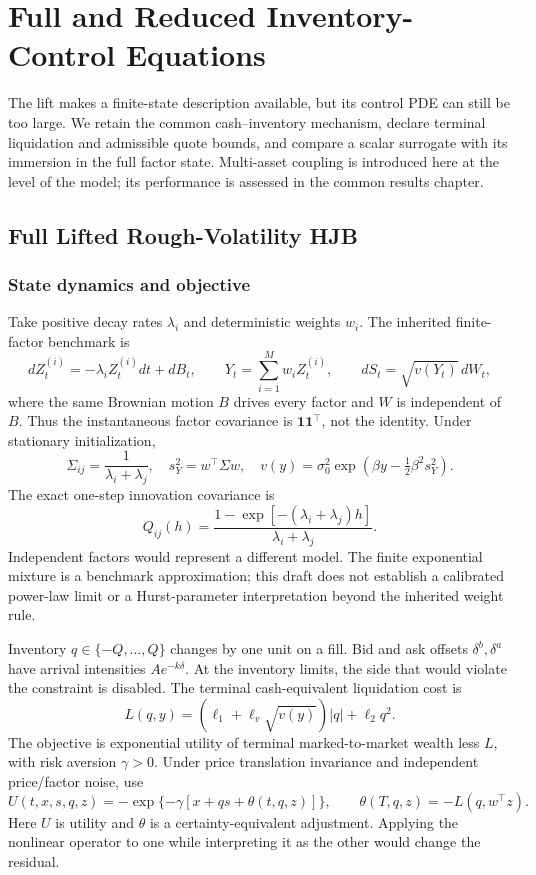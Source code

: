 \chapter{Full and Reduced Inventory-Control Equations}\label{ch:control}
The lift makes a finite-state description available, but its control PDE can still be too large. We retain the common cash--inventory mechanism, declare terminal liquidation and admissible quote bounds, and compare a scalar surrogate with its immersion in the full factor state. Multi-asset coupling is introduced here at the level of the model; its performance is assessed in the common results chapter.
\section{Full Lifted Rough-Volatility HJB}


\subsection{State dynamics and objective}
Take positive decay rates $\lambda_i$ and deterministic weights $w_i$. The inherited finite-factor benchmark is
\[
 dZ_t^{(i)}=-\lambda_i Z_t^{(i)}dt+dB_t,\qquad
 Y_t=\sum_{i=1}^M w_iZ_t^{(i)},\qquad
 dS_t=\sqrt{v(Y_t)}\,dW_t,
\]
where the same Brownian motion $B$ drives every factor and $W$ is independent of $B$. Thus the instantaneous factor covariance is $\mathbf1\mathbf1^\top$, not the identity. Under stationary initialization,
\[
 \Sigma_{ij}=\frac1{\lambda_i+\lambda_j},\quad
 s_Y^2=w^\top\Sigma w,\quad
 v(y)=\sigma_0^2\exp\!\left(\beta y-\tfrac12\beta^2s_Y^2\right).
\]
The exact one-step innovation covariance is
\[
 Q_{ij}(h)=\frac{1-\exp[-(\lambda_i+\lambda_j)h]}{\lambda_i+\lambda_j}.
\]
Independent factors would represent a different model. The finite exponential mixture is a benchmark approximation; this draft does not establish a calibrated power-law limit or a Hurst-parameter interpretation beyond the inherited weight rule.

Inventory $q\in\{-Q,\ldots,Q\}$ changes by one unit on a fill. Bid and ask offsets $\delta^b,\delta^a$ have arrival intensities $A e^{-k\delta}$. At the inventory limits, the side that would violate the constraint is disabled. The terminal cash-equivalent liquidation cost is
\[
 L(q,y)=(\ell_1+\ell_v\sqrt{v(y)})|q|+\ell_2q^2.
\]
The objective is exponential utility of terminal marked-to-market wealth less $L$, with risk aversion $\gamma>0$. Under price translation invariance and independent price/factor noise, use
\[
 U(t,x,s,q,z)=-\exp\{-\gamma[x+qs+\theta(t,q,z)]\},
 \qquad \theta(T,q,z)=-L(q,w^\top z).
\]
Here $U$ is utility and $\theta$ is a certainty-equivalent adjustment. Applying the nonlinear operator to one while interpreting it as the other would change the residual.


